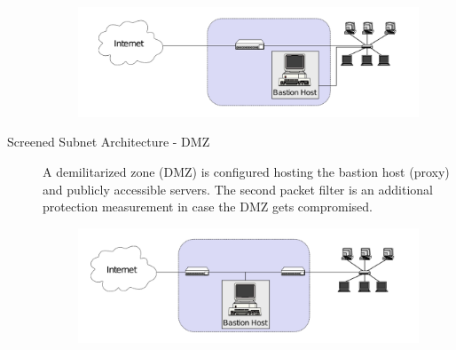 \begin{description}
\begin{figure}[H]
      \centering
      \includegraphics[width=.8\textwidth]{figures/firewall_screening_host_architecture.png}
    \end{figure}
  \item[Screened Subnet Architecture - DMZ] A demilitarized zone (DMZ) is configured hosting the bastion host (proxy) and publicly accessible servers.
    The second packet filter is an additional protection measurement in case the DMZ gets compromised.
    \begin{figure}[H]
      \centering
      \includegraphics[width=.8\textwidth]{figures/firewall_screened_subnet_architecture.png}
    \end{figure}
\end{description}
